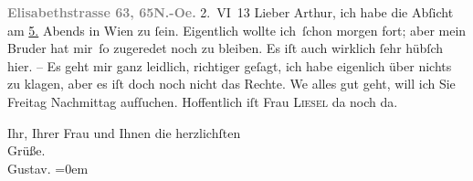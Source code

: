 \pstart
           \textcolor{gray}{\textbf{Elisabethstrasse 63, 65}}\hfill \textcolor{gray}{\textbf{N.-Oe.}}\pend
           \vspace{1em}
\pstart
           \raggedleft{}{\pb}2. VI 13\pend
           \vspace{0.5em}
\pstart
           Lieber Arthur, ich habe die Abſicht am \uline{5.} Abends in Wien zu{ }ſein. Eigentlich
               wollte ich ſchon morgen fort; aber mein Bruder hat mir ſo zugeredet noch zu bleiben. Es iſt auch wirklich{ }ſehr
               hübſch hier. – Es geht mir ganz leidlich, richtiger geſagt, ich habe eigenlich über
               nichts zu klagen, aber es iſt doch noch nicht das Rechte. We{\geminationn} alles gut geht, will ich Sie Freitag
               Nachmittag aufſuchen. Hoffentlich iſt Frau \textsc{Liesel} da{\geminationn} noch da.\pend
           
\pstart
           Ihr, Ihrer Frau und Ihnen die herzlichſten{\\[\baselineskip]}Grüße.{\\[\baselineskip]}\spacefill\mbox{Gustav.}\pend
           \leftskip=0em{}\endnumbering{}
\begin{anhang}
\end{anhang}\newcommand{\dateiname}{L04257}\newcommand{\titel}{Gustav Schwarzkopf an Arthur Schnitzler, 2. 6. 1913}\newcommand{\editorInnen}{Herausgegeben von Jahnke, SelmaMüller, Martin Anton}
